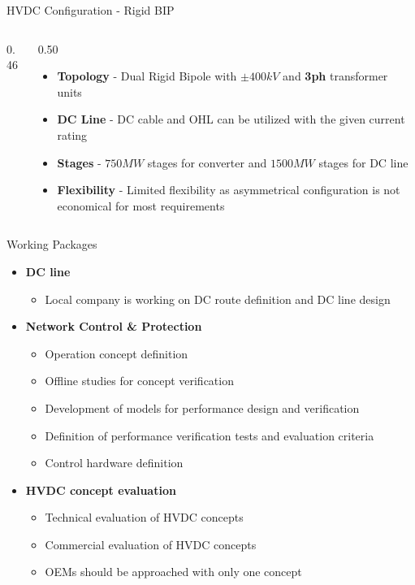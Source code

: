 \begin{frame}{HVDC Configuration - Rigid BIP}
  \begin{columns}[c,onlytextwidth]
    \begin{column}{0.46\textwidth}
      \centering
    \end{column}
    \begin{column}{0.50\textwidth}
      \vspace{0.5em}
      \begin{itemize}
        \setlength{\itemsep}{0.7em}
        \item \textbf{Topology} - Dual Rigid Bipole with $\pm400kV$ and \textbf{3ph} transformer units
        \item \textbf{DC Line} - DC cable and OHL can be utilized with the given current rating
        \item \textbf{Stages} - $750MW$ stages for converter and $1500MW$ stages for DC line
        \item \textbf{Flexibility} - Limited flexibility as asymmetrical configuration is not economical for most requirements
      \end{itemize}
    \end{column}
  \end{columns}
\end{frame}


\begin{frame}{Working Packages}
  \begin{itemize}
  \setlength{\itemsep}{0.5em}
  \item \textbf{DC line}
    \begin{itemize}
      \item Local company is working on DC route definition and DC line design

    \end{itemize}
  \item \textbf{Network Control \& Protection}
    \begin{itemize}
      \item Operation concept definition
      \item Offline studies for concept verification
      \item Development of models for performance design and verification
      \item Definition of performance verification tests and evaluation criteria
      \item Control hardware definition
    \end{itemize}
  \item \textbf{HVDC concept evaluation}
    \begin{itemize}
      \item Technical evaluation of HVDC concepts
      \item Commercial evaluation of HVDC concepts
      \item OEMs should be approached with only one concept
    \end{itemize}
\end{itemize}
\end{frame}


